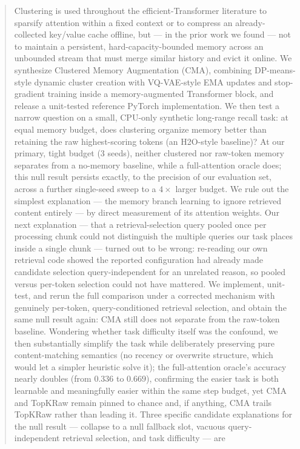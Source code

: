 \documentclass[11pt]{article}
\begin{document}
\begin{abstract}
Clustering is used throughout the efficient-Transformer literature to sparsify attention within
a fixed context or to compress an already-collected key/value cache offline, but --- in the prior
work we found --- not to maintain a persistent, hard-capacity-bounded memory across an unbounded
stream that must merge similar history and evict it online. We synthesize Clustered Memory
Augmentation (CMA), combining DP-means-style dynamic cluster creation with VQ-VAE-style EMA
updates and stop-gradient training inside a memory-augmented Transformer block, and release a
unit-tested reference PyTorch implementation. We then test a narrow question on a small,
CPU-only synthetic long-range recall task: at equal memory budget, does clustering organize
memory better than retaining the raw highest-scoring tokens (an H2O-style baseline)? At our
primary, tight budget (3 seeds), neither clustered nor raw-token memory separates from a
no-memory baseline, while a full-attention oracle does; this null result persists exactly, to the
precision of our evaluation set, across a further single-seed sweep to a $4\times$ larger budget.
We rule out the simplest explanation --- the memory branch learning to ignore retrieved content
entirely --- by direct measurement of its attention weights. Our next explanation --- that a
retrieval-selection query pooled once per processing chunk could not distinguish the multiple
queries our task places inside a single chunk --- turned out to be wrong: re-reading our own
retrieval code showed the reported configuration had already made candidate selection
query-independent for an unrelated reason, so pooled versus per-token selection could not have
mattered. We implement, unit-test, and rerun the full comparison under a corrected mechanism with
genuinely per-token, query-conditioned retrieval selection, and obtain the same null result again:
CMA still does not separate from the raw-token baseline. Wondering whether task difficulty itself
was the confound, we then substantially simplify the task while deliberately preserving pure
content-matching semantics (no recency or overwrite structure, which would let a simpler
heuristic solve it); the full-attention oracle's accuracy nearly doubles (from $0.336$ to
$0.669$), confirming the easier task is both learnable and meaningfully easier within the same
step budget, yet CMA and TopKRaw remain pinned to chance and, if anything, CMA trails TopKRaw
rather than leading it. Three specific candidate explanations for the null result --- collapse to
a null fallback slot, vacuous query-independent retrieval selection, and task difficulty --- are

\end{abstract}
\end{document}
